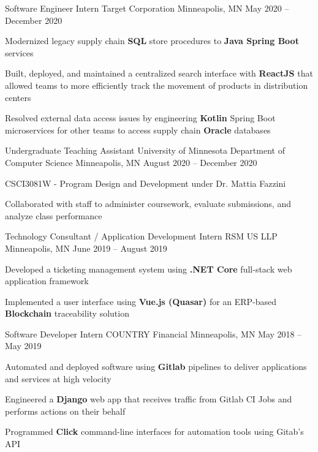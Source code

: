 \documentclass[]{awesome-cv}
\begin{document}
\vspace{-9mm}
\begin{cventries}
	\cventry
	{Software Engineer Intern}
	{Target Corporation}
	{Minneapolis, MN}
	{May 2020 – December 2020}
	{\begin{cvitems}
		\item {Modernized legacy supply chain \textbf{SQL} store procedures to \textbf{Java Spring Boot} services}
		\item {Built, deployed, and maintained a centralized search interface with \textbf{ReactJS} that allowed teams to more efficiently track the movement of products in distribution centers}
		\item {Resolved external data access issues by engineering \textbf{Kotlin} Spring Boot microservices for other teams to access supply chain \textbf{Oracle} databases}
		\end{cvitems}}
	\cventry
	{Undergraduate Teaching Assistant}
	{University of Minnesota Department of Computer Science}
	{Minneapolis, MN}
	{August 2020 – December 2020}
	{\begin{cvitems}
    	\item {CSCI3081W - Program Design and Development under Dr. Mattia Fazzini}
		\item {Collaborated with staff to administer coursework, evaluate submissions, and analyze class performance}
		\end{cvitems}}
	\cventry
	{Technology Consultant / Application Development Intern}
	{RSM US LLP}
	{Minneapolis, MN}
	{June 2019 – August 2019}
	{\begin{cvitems}
		\item {Developed a ticketing management system using  \textbf{.NET Core} full-stack web application framework}
		\item {Implemented a user interface using \textbf{Vue.js (Quasar)} for an ERP-based \textbf{Blockchain} traceability solution}
		\end{cvitems}}
	\cventry
	{Software Developer Intern}
	{COUNTRY Financial}
	{Minneapolis, MN}
	{May 2018 – May 2019}
	{\begin{cvitems}
		\item {Automated and deployed software using \textbf{Gitlab} pipelines to deliver applications and services at high velocity}
		\item {Engineered a \textbf{Django} web app that receives traffic from Gitlab CI Jobs and performs actions on their behalf}
		\item{Programmed \textbf{Click} command-line interfaces for automation tools using Gitab’s API}
		\end{cvitems}}
\end{cventries}
\end{document}
